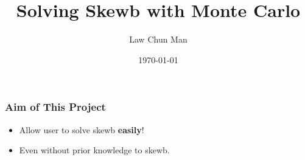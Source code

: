 \documentclass[aspectratio=169]{beamer}
\title[Highlights]{Solving Skewb with Monte Carlo}
\author{Law Chun Man}
\institute{PHYS 4061 Project B}
\date{\today}
\begin{document}
\frame{\titlepage}





\begin{frame}
\frametitle{Aim of This Project}
\begin{itemize}
 \item Allow user to solve skewb \textbf{easily}!
 \item Even without prior knowledge to skewb.
\end{itemize}
\end{frame}





%
%
%
%
%
%
%
%
%
\end{document}
